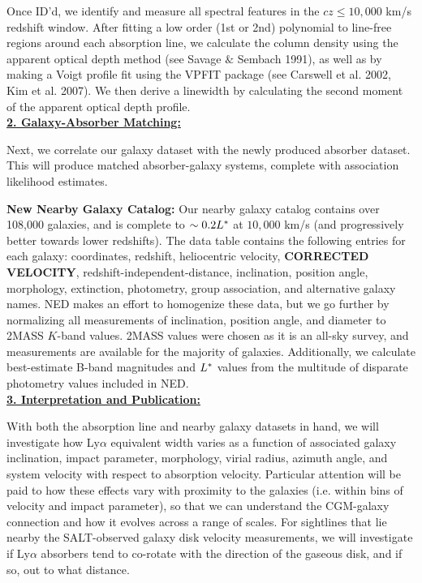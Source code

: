 \documentclass[12pt]{article}
\begin{document}
Once ID'd, we identify and measure all spectral features in the $cz\le 10,000$ km/s redshift window. After fitting a low order (1st or 2nd) polynomial to line-free regions around each absorption line, we calculate the column density using the apparent optical depth method (see Savage $\&$ Sembach 1991), as well as by making a Voigt profile fit using the VPFIT package (see Carswell et al. 2002, Kim et al. 2007). We then derive a linewidth by calculating the second moment of the apparent optical depth profile.\\

\noindent \textbf{\underline{2. Galaxy-Absorber Matching:}}

Next, we correlate our galaxy dataset with the newly produced absorber dataset. This will produce matched absorber-galaxy systems, complete with association likelihood estimates. 

\textbf{New Nearby Galaxy Catalog:} Our nearby galaxy catalog contains over 108,000 galaxies, and is complete to $\sim0.2 L^{\**}$ at $10,000$ km/s (and progressively better towards lower redshifts). The data table contains the following entries for each galaxy: coordinates, redshift, heliocentric velocity, \textbf{CORRECTED VELOCITY}, redshift-independent-distance, inclination, position angle, morphology, extinction, photometry, group association, and alternative galaxy names. NED makes an effort to homogenize these data, but we go further by normalizing all measurements of inclination, position angle, and diameter to 2MASS $K$-band values. 2MASS values were chosen as it is an all-sky survey, and measurements are available for the majority of galaxies. Additionally, we calculate best-estimate B-band magnitudes and $L^{\**}$ values from the multitude of disparate photometry values included in NED. \\

\noindent \textbf{\underline{3. Interpretation and Publication:}}

With both the absorption line and nearby galaxy datasets in hand, we will investigate how Ly$\alpha$ equivalent width varies as a function of associated galaxy inclination, impact parameter, morphology, virial radius, azimuth angle, and system velocity with respect to absorption velocity. Particular attention will be paid to how these effects vary with proximity to the galaxies (i.e. within bins of velocity and impact parameter), so that we can understand the CGM-galaxy connection and how it evolves across a range of scales. For sightlines that lie nearby the SALT-observed galaxy disk velocity measurements, we will investigate if Ly$\alpha$ absorbers tend to co-rotate with the direction of the gaseous disk, and if so, out to what distance.
\end{document}
